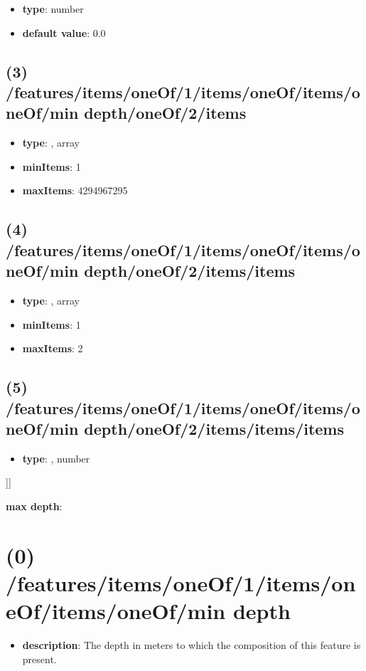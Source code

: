 \begin{itemize}[leftmargin=4em]\item {\bf type}: number\item {\bf default value}: 0.0
\end{itemize}\subsection{(3) /features/items/oneOf/1/items/oneOf/items/oneOf/min depth/oneOf/2/items}
\begin{itemize}[leftmargin=3em]\item {\bf type}: , array\item {\bf minItems}: 1
\item {\bf maxItems}: 4294967295
\end{itemize}\subsection{(4) /features/items/oneOf/1/items/oneOf/items/oneOf/min depth/oneOf/2/items/items}
\begin{itemize}[leftmargin=4em]\item {\bf type}: , array\item {\bf minItems}: 1
\item {\bf maxItems}: 2
\end{itemize}\subsection{(5) /features/items/oneOf/1/items/oneOf/items/oneOf/min depth/oneOf/2/items/items/items}
\begin{itemize}[leftmargin=5em]\item {\bf type}: , number\end{itemize}]]\item {\bf max depth}: \section{(0) /features/items/oneOf/1/items/oneOf/items/oneOf/min depth}
\begin{itemize}[leftmargin=0em]\item {\bf description}: The depth in meters to which the composition of this feature is present.
\end{itemize}
